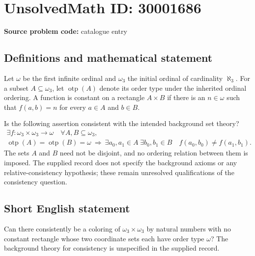 \documentclass[11pt]{article}
\begin{document}
\section*{UnsolvedMath ID: 30001686}
\textbf{Source problem code:} catalogue entry
\subsection{Definitions and mathematical statement}
Let \(\omega\) be the first infinite ordinal and \(\omega_3\) the initial ordinal of cardinality \(\aleph_3\). For a subset \(A\subseteq\omega_3\), let \(\operatorname{otp}(A)\) denote its order type under the inherited ordinal ordering. A function is constant on a rectangle \(A\times B\) if there is an \(n\in\omega\) such that \(f(a,b)=n\) for every \(a\in A\) and \(b\in B\).

Is the following assertion consistent with the intended background set theory?
\[
\begin{gathered}
\exists f:\omega_3\times\omega_3\longrightarrow\omega\quad
\forall A,B\subseteq\omega_3,\\
\operatorname{otp}(A)=\operatorname{otp}(B)=\omega
\ \Longrightarrow\
\exists a_0,a_1\in A\;\exists b_0,b_1\in B\quad
f(a_0,b_0)\ne f(a_1,b_1).
\end{gathered}
\]
The sets \(A\) and \(B\) need not be disjoint, and no ordering relation between them is imposed. The supplied record does not specify the background axioms or any relative-consistency hypothesis; these remain unresolved qualifications of the consistency question.
\subsection{Short English statement}
Can there consistently be a coloring of \(\omega_3\times\omega_3\) by natural numbers with no constant rectangle whose two coordinate sets each have order type \(\omega\)? The background theory for consistency is unspecified in the supplied record.
\end{document}
